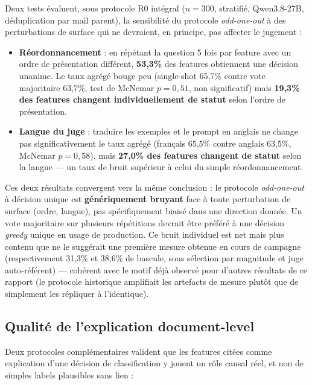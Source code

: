 \documentclass[11pt]{article}
\begin{document}
Deux tests évaluent, sous protocole R0 intégral ($n=300$, stratifié,
Qwen3.8-27B, déduplication par mail parent), la sensibilité du protocole
\emph{odd-one-out} à des perturbations de surface qui ne devraient, en
principe, pas affecter le jugement :

\begin{itemize}
  \item \textbf{Réordonnancement} : en répétant la question 5 fois par
    feature avec un ordre de présentation différent, \textbf{53,3\%} des
    features obtiennent une décision unanime. Le taux agrégé bouge peu
    (single-shot 65,7\% contre vote majoritaire 63,7\%, test de McNemar
    $p=0{,}51$, non significatif) mais \textbf{19,3\% des features changent
    individuellement de statut} selon l'ordre de présentation.
  \item \textbf{Langue du juge} \cite{resck2025multilingual, multilingualconcepts2025} : traduire les exemples et le prompt en
    anglais ne change pas significativement le taux agrégé (français 65,5\%
    contre anglais 63,5\%, McNemar $p=0{,}58$), mais \textbf{27,0\% des
    features changent de statut} selon la langue --- un taux de bruit
    supérieur à celui du simple réordonnancement.
\end{itemize}

Ces deux résultats convergent vers la même conclusion : le protocole
\emph{odd-one-out} à décision unique est \textbf{génériquement bruyant} face
à toute perturbation de surface (ordre, langue), pas spécifiquement biaisé
dans une direction donnée. Un vote majoritaire sur plusieurs répétitions
devrait être préféré à une décision \emph{greedy} unique en usage de
production. Ce bruit individuel est net mais plus contenu que ne le
suggérait une première mesure obtenue en cours de campagne (respectivement
31,3\% et 38,6\% de bascule, sous sélection par magnitude et juge
auto-référent) --- cohérent avec le motif déjà observé pour d'autres
résultats de ce rapport (le protocole historique amplifiait les artefacts
de mesure plutôt que de simplement les répliquer à l'identique).

\subsection{Qualité de l'explication document-level}

Deux protocoles complémentaires valident que les features citées comme
explication d'une décision de classification y jouent un rôle causal réel,
et non de simples labels plausibles sans lien :
\end{document}
